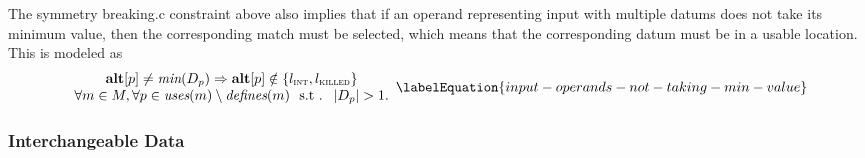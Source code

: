 The \gls{symmetry breaking.c} \gls{constraint} above also implies that if an
\gls{operand} representing input with multiple \glspl{datum} does not take its
minimum value, then the corresponding \gls{match} must be selected, which means
that the corresponding \gls{datum} must be in a usable location.
%
This is modeled as
\begin{equation}
  \begin{array}{c}
    \mVar{alt}[p] \neq \mMin(\mDataSet[p])
    \mImp
    \mVar{alt}[p] \notin \mSet{\mIntLocation, \mKilledLocation} \\
    \forall m \in \mMatchSet,
    \forall p \in \mUses(m) \setminus \mDefines(m)
    \text{ \st }
    \mCard{\mDataSet[p]} > 1.
  \end{array}
  \labelEquation{input-operands-not-taking-min-value}
\end{equation}


\subsubsection{Interchangeable Data}

